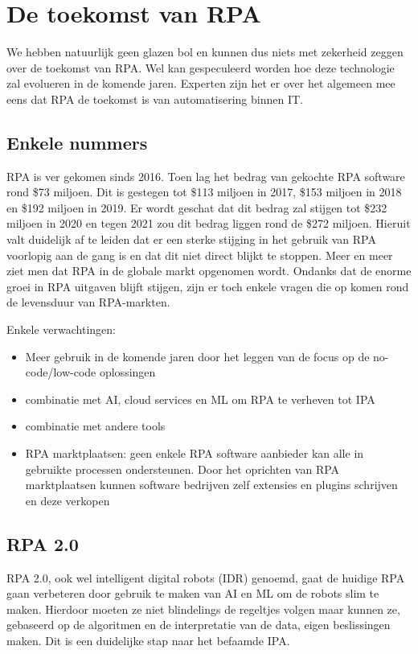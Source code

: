 \section{De toekomst van RPA}
We hebben natuurlijk geen glazen bol en kunnen dus niets met zekerheid zeggen over de toekomst van RPA. Wel kan gespeculeerd worden hoe deze technologie zal evolueren in de komende jaren. Experten zijn het er over het algemeen mee eens dat RPA de toekomst is van automatisering binnen IT. \autocite{futRPA}

\subsection{Enkele nummers}
RPA is ver gekomen sinds 2016. Toen lag het bedrag van gekochte RPA software rond \$73 miljoen. Dit is gestegen tot \$113 miljoen in 2017, \$153 miljoen in 2018 en \$192 miljoen in 2019. Er wordt geschat dat dit bedrag zal stijgen tot \$232 miljoen in 2020 en tegen 2021 zou dit bedrag liggen rond de \$272 miljoen. Hieruit valt duidelijk af te leiden dat er een sterke stijging in het gebruik van RPA voorlopig aan de gang is en dat dit niet direct blijkt te stoppen. Meer en meer ziet men dat RPA in de globale markt opgenomen wordt. \autocite{futRPA} Ondanks dat de enorme groei in RPA uitgaven blijft stijgen, zijn er toch enkele vragen die op komen rond de levensduur van RPA-markten. \autocite{everythingRPA}

Enkele verwachtingen:
\begin{itemize}
	\item Meer gebruik in de komende jaren door het leggen van de focus op de no-code/low-code oplossingen 
	\item combinatie met AI, cloud services en ML om RPA te verheven tot IPA
	\item combinatie met andere tools
	\item RPA marktplaatsen: geen enkele RPA software aanbieder kan alle in gebruikte processen ondersteunen. Door het oprichten van RPA marktplaatsen kunnen software bedrijven zelf extensies en plugins schrijven en deze verkopen
\end{itemize} \autocite{futureRPA}\autocite{everythingRPA}

\subsection{RPA 2.0}
RPA 2.0, ook wel intelligent digital robots (IDR) genoemd, gaat de huidige RPA gaan verbeteren door gebruik te maken van AI en ML om de robots slim te maken. Hierdoor moeten ze niet blindelings de regeltjes volgen maar kunnen ze, gebaseerd op de algoritmen en de interpretatie van de data, eigen beslissingen maken. Dit is een duidelijke stap naar het befaamde IPA. \autocite{idrRPA}

